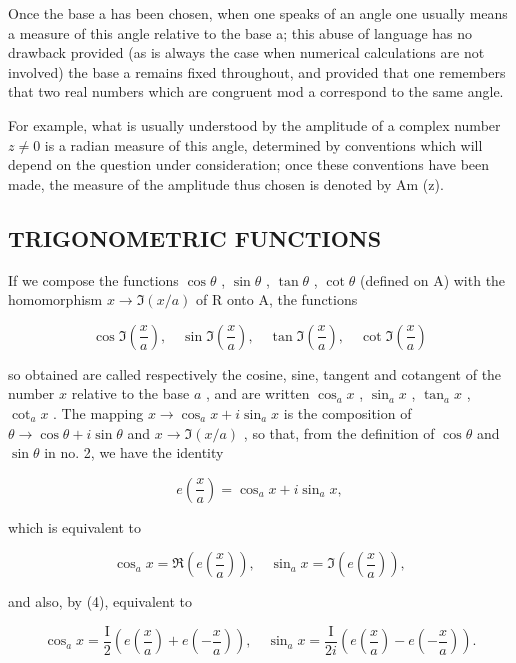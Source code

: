 Once the base a has been chosen, when one speaks of an angle one usually means a measure of this angle relative to the base a; this abuse of language has no drawback provided (as is always the case when numerical calculations are not involved) the base a remains fixed throughout, and provided that one remembers that two real numbers which are congruent mod a correspond to the same angle.

For example, what is usually understood by the amplitude of a complex number \(z \neq 0\) is a radian measure of this angle, determined by conventions which will depend on the question under consideration; once these conventions have been made, the measure of the amplitude thus chosen is denoted by Am (z).

\subsection{TRIGONOMETRIC FUNCTIONS}

If we compose the functions \(\cos\theta\) , \(\sin\theta\) , \(\tan\theta\) , \(\cot\theta\) (defined on A) with the homomorphism \(x\to\Im(x/a)\) of R onto A, the functions

\[
\cos \Im \left(\frac {x}{a}\right), \quad \sin \Im \left(\frac {x}{a}\right), \quad \tan \Im \left(\frac {x}{a}\right), \quad \cot \Im \left(\frac {x}{a}\right)
\]

so obtained are called respectively the cosine, sine, tangent and cotangent of the number \(x\) relative to the base \(a\) , and are written \(\cos_a x\) , \(\sin_a x\) , \(\tan_a x\) , \(\cot_a x\) . The mapping \(x \to \cos_a x + i \sin_a x\) is the composition of \(\theta \to \cos \theta + i \sin \theta\) and \(x \to \Im(x/a)\) , so that, from the definition of \(\cos \theta\) and \(\sin \theta\) in no. 2, we have the identity

\[
e \left(\frac {x}{a}\right) = \cos_ {a} x + i \sin_ {a} x,\tag{5}
\]

which is equivalent to

\[
\cos_ {a} x = \Re \left(e \left(\frac {x}{a}\right)\right), \quad \sin_ {a} x = \Im \left(e \left(\frac {x}{a}\right)\right),
\]

and also, by (4), equivalent to

\[
\cos_ {a} x = \frac {\mathrm{I}}{2} \left(e \left(\frac {x}{a}\right) + e \left(- \frac {x}{a}\right)\right), \quad \sin_ {a} x = \frac {\mathrm{I}}{2 i} \left(e \left(\frac {x}{a}\right) - e \left(- \frac {x}{a}\right)\right).
\]

